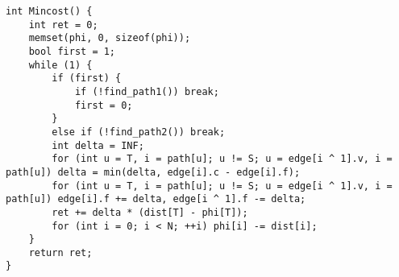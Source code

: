 \begin{verbatim}
int Mincost() {
    int ret = 0;
    memset(phi, 0, sizeof(phi));
    bool first = 1;
    while (1) {
        if (first) {
            if (!find_path1()) break;
            first = 0;
        }
        else if (!find_path2()) break;
        int delta = INF;
        for (int u = T, i = path[u]; u != S; u = edge[i ^ 1].v, i = path[u]) delta = min(delta, edge[i].c - edge[i].f);
        for (int u = T, i = path[u]; u != S; u = edge[i ^ 1].v, i = path[u]) edge[i].f += delta, edge[i ^ 1].f -= delta;
        ret += delta * (dist[T] - phi[T]);
        for (int i = 0; i < N; ++i) phi[i] -= dist[i];
    }
    return ret;
}
\end{verbatim}

